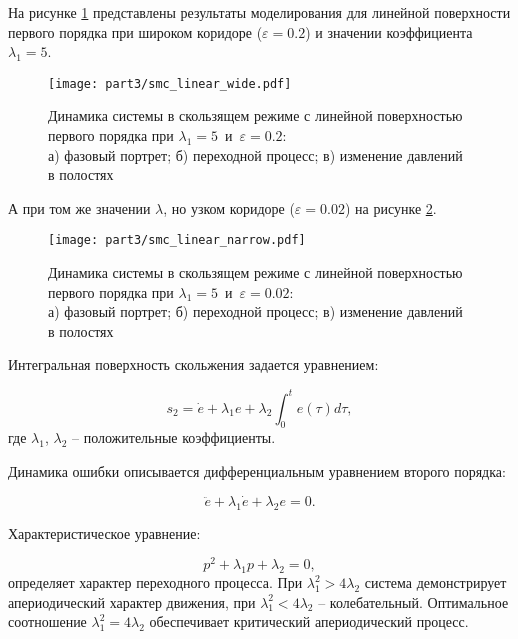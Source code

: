 На рисунке \ref{fig:smc_linear_wide} представлены результаты моделирования для линейной поверхности первого порядка при широком коридоре
($\varepsilon = \num{0.2}$) и значении коэффициента $\lambda_1 = 5$.

\begin{figure}[ht]
	\centering
	\texttt{[image: part3/smc\_linear\_wide.pdf]}
	\caption{Динамика системы в скользящем режиме с линейной поверхностью первого порядка при $\lambda_1 = \num{5}$~и~$\varepsilon=\num{0.2}$: \\
		а) фазовый портрет; б) переходной процесс; в) изменение давлений в полостях}
	\label{fig:smc_linear_wide}
\end{figure}

А при том же значении $\lambda$, но узком коридоре ($\varepsilon = \num{0.02}$) на рисунке \ref{fig:smc_linear_narrow}.

\begin{figure}[ht]
	\centering
	\texttt{[image: part3/smc\_linear\_narrow.pdf]}
	\caption{Динамика системы в скользящем режиме с линейной поверхностью первого порядка при $\lambda_1 = \num{5}$~и~$\varepsilon=\num{0.02}$: \\
		а) фазовый портрет; б) переходной процесс; в) изменение давлений в полостях}
	\label{fig:smc_linear_narrow}
\end{figure}

Интегральная поверхность скольжения задается уравнением:

\begin{equation}
	s_2 = \dot{e} + \lambda_1 e + \lambda_2 \int_0^t e(\tau)d\tau,
\end{equation}
где $\lambda_1$, $\lambda_2$ -- положительные коэффициенты.

Динамика ошибки описывается дифференциальным уравнением второго порядка:

\begin{equation}
	\ddot{e} + \lambda_1 \dot{e} + \lambda_2 e = 0.
\end{equation}

Характеристическое уравнение:

\begin{equation}
	p^2 + \lambda_1 p + \lambda_2 = 0,
\end{equation}
определяет характер переходного процесса. При $\lambda_1^2 > 4\lambda_2$ система демонстрирует
апериодический характер движения, при $\lambda_1^2 < 4\lambda_2$ -- колебательный.
Оптимальное соотношение $\lambda_1^2 = 4\lambda_2$ обеспечивает критический апериодический процесс.

